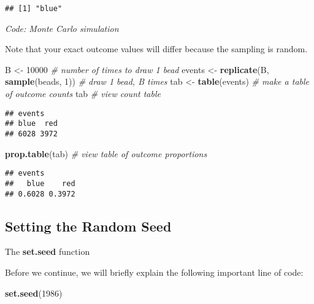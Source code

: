 \documentclass[
]{article}
\newenvironment{Shaded}{\begin{snugshade}}{\end{snugshade}}
\newcommand{\CommentTok}[1]{\textcolor[rgb]{0.56,0.35,0.01}{\textit{#1}}}
\newcommand{\DecValTok}[1]{\textcolor[rgb]{0.00,0.00,0.81}{#1}}
\newcommand{\KeywordTok}[1]{\textcolor[rgb]{0.13,0.29,0.53}{\textbf{#1}}}
\newcommand{\NormalTok}[1]{#1}
\newcommand{\StringTok}[1]{\textcolor[rgb]{0.31,0.60,0.02}{#1}}
\begin{document}
\begin{verbatim}
## [1] "blue"
\end{verbatim}

\emph{Code: Monte Carlo simulation}

Note that your exact outcome values will differ because the sampling is
random.

\begin{Shaded}
\begin{Highlighting}[]
\NormalTok{B <-}\StringTok{ }\DecValTok{10000}    \CommentTok{# number of times to draw 1 bead}
\NormalTok{events <-}\StringTok{ }\KeywordTok{replicate}\NormalTok{(B, }\KeywordTok{sample}\NormalTok{(beads, }\DecValTok{1}\NormalTok{))    }\CommentTok{# draw 1 bead, B times}
\NormalTok{tab <-}\StringTok{ }\KeywordTok{table}\NormalTok{(events)    }\CommentTok{# make a table of outcome counts}
\NormalTok{tab    }\CommentTok{# view count table}
\end{Highlighting}
\end{Shaded}

\begin{verbatim}
## events
## blue  red 
## 6028 3972
\end{verbatim}

\begin{Shaded}
\begin{Highlighting}[]
\KeywordTok{prop.table}\NormalTok{(tab)    }\CommentTok{# view table of outcome proportions}
\end{Highlighting}
\end{Shaded}

\begin{verbatim}
## events
##   blue    red 
## 0.6028 0.3972
\end{verbatim}

\hypertarget{setting-the-random-seed}{%
\subsection{Setting the Random Seed}\label{setting-the-random-seed}}

The \textbf{set.seed} function

Before we continue, we will briefly explain the following important line
of code:

\begin{Shaded}
\begin{Highlighting}[]
\KeywordTok{set.seed}\NormalTok{(}\DecValTok{1986}\NormalTok{)}
\end{Highlighting}
\end{Shaded}
\end{document}
